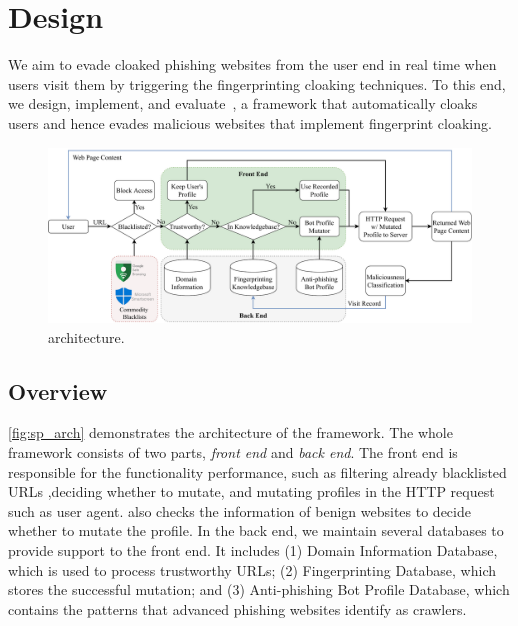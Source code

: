 \section{Design}


We aim to evade cloaked phishing websites from the user end in real time when users visit them by triggering the fingerprinting cloaking techniques.
To this end, we design, implement, and evaluate~\spartacus, a framework that automatically cloaks users and hence evades malicious websites that implement fingerprint cloaking.

\begin{figure}
\centering
\includegraphics[width=\linewidth]{figs/arch.pdf}
\caption{\spartacus architecture.}
\label{fig:sp_arch}
\end{figure}

\subsection{Overview}
\autoref{fig:sp_arch} demonstrates the architecture of the \spartacus framework.
The whole framework consists of two parts, \emph{front end} and \emph{back end}. 
The front end is responsible for the functionality performance, such as filtering already blacklisted URLs ,deciding whether to mutate, and mutating profiles in the HTTP request such as user agent.
\spartacus also checks the information of benign websites to decide whether to mutate the profile.
In the back end, we maintain several databases to provide support to the front end.
It includes (1) Domain Information Database, which is used to process trustworthy URLs;
(2) Fingerprinting Database, which stores the successful mutation;
and (3) Anti-phishing Bot Profile Database, which contains the patterns that advanced phishing websites identify as crawlers.

